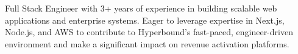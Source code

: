 \documentclass[letter,10pt]{article}
\begin{document}
Full Stack Engineer with 3+ years of experience in building scalable web applications and enterprise systems. Eager to leverage expertise in Next.js, Node.js, and AWS to contribute to Hyperbound's fast-paced, engineer-driven environment and make a significant impact on revenue activation platforms.
\end{document}
